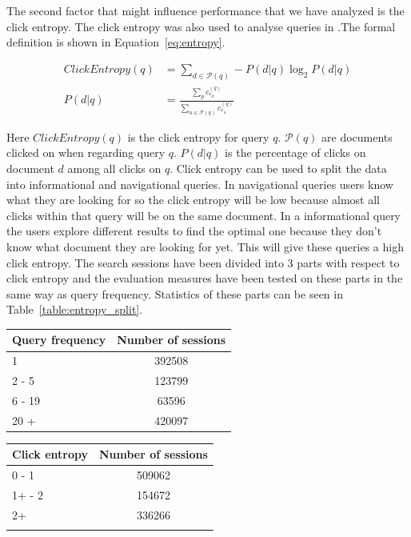 The second factor that might influence performance that we have analyzed is the click entropy. The click entropy was also used to analyse queries in \cite{dou2008}.The formal definition is shown in Equation~\ref{eq:entropy}.

\begin{align}
	ClickEntropy(q) &= \sum_{d \in \mathcal{P}(q)} - P(d|q) \log_2 P(d|q) \label{eq:entropy} \\
	P(d|q) &= \frac{\sum_p c_{r_d}^{(q)}}{\sum_{u \in \mathcal{P}(q)} c_{r_u}^{(q)}} \label{eq:entropy_2}
\end{align}

Here $ClickEntropy(q)$ is the click entropy for query $q$. $\mathcal{P}(q)$ are documents clicked on when regarding query $q$. $P(d|q)$ is the percentage of clicks on document $d$ among all clicks on $q$.  Click entropy can be used to split the data into informational and navigational queries. In navigational queries users know what they are looking for so the click entropy will be low because almost all clicks within that query will be on the same document. In a informational query the users explore different results to find the optimal one because they don't know what document they are looking for yet. This will give these queries a high click entropy.
The search sessions have been divided into 3 parts with respect to click entropy and the evaluation measures have been tested on these parts in the same way as query frequency. Statistics of these parts can be seen in Table~\ref{table:entropy_split}.
\\

\begin{minipage}[b]{.4\textwidth}
	\centering
\begin{tabular}{lc}
\hline
Query frequency & Number of sessions \\ \midrule
1               & 392508            \\ 
2 - 5           & 123799            \\ 
6 - 19          & 63596             \\ 
20 +            & 420097            \\ \bottomrule
\end{tabular}
\label{table:query_split}
\end{minipage}
\qquad
\begin{minipage}[b]{.4\textwidth}
\begin{tabular}{lc}
\toprule
Click entropy & Number of sessions \\ \midrule
0 - 1         & 509062             \\ 
1+ - 2        & 154672             \\ 
2+            & 336266             \\ \bottomrule \\
\end{tabular}
\label{table:entropy_split}
\end{minipage}

